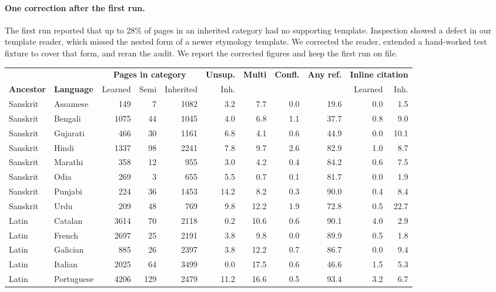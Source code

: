\documentclass[11pt]{article}
\begin{document}
\paragraph{One correction after the first run.} The first run reported that up to 28\% of pages in an inherited category had no supporting template. Inspection showed a defect in our template reader, which missed the nested form of a newer etymology template. We corrected the reader, extended a hand-worked test fixture to cover that form, and reran the audit. We report the corrected figures and keep the first run on file.

\begin{table}[t]
\centering\small
\begin{tabular}{llrrrrrrrrr}
\toprule
& & \multicolumn{3}{c}{\textbf{Pages in category}} & \textbf{Unsup.} & \textbf{Multi} & \textbf{Confl.} & \textbf{Any ref.} & \multicolumn{2}{c}{\textbf{Inline citation}} \\
\textbf{Ancestor} & \textbf{Language} & Learned & Semi & Inherited & Inh. & & & & Learned & Inh. \\
\midrule
Sanskrit & Assamese & 149 & 7 & 1082 & 3.2 & 7.7 & 0.0 & 19.6 & 0.0 & 1.5 \\
Sanskrit & Bengali & 1075 & 44 & 1045 & 4.0 & 6.8 & 1.1 & 37.7 & 0.8 & 9.0 \\
Sanskrit & Gujarati & 466 & 30 & 1161 & 6.8 & 4.1 & 0.6 & 44.9 & 0.0 & 10.1 \\
Sanskrit & Hindi & 1337 & 98 & 2241 & 7.8 & 9.7 & 2.6 & 82.9 & 1.0 & 8.7 \\
Sanskrit & Marathi & 358 & 12 & 955 & 3.0 & 4.2 & 0.4 & 84.2 & 0.6 & 7.5 \\
Sanskrit & Odia & 269 & 3 & 655 & 5.5 & 0.7 & 0.1 & 81.7 & 0.0 & 1.9 \\
Sanskrit & Punjabi & 224 & 36 & 1453 & 14.2 & 8.2 & 0.3 & 90.0 & 0.4 & 8.4 \\
Sanskrit & Urdu & 209 & 48 & 769 & 9.8 & 12.2 & 1.9 & 72.8 & 0.5 & 22.7 \\
\midrule
Latin & Catalan & 3614 & 70 & 2118 & 0.2 & 10.6 & 0.6 & 90.1 & 4.0 & 2.9 \\
Latin & French & 2697 & 25 & 2191 & 3.8 & 9.8 & 0.0 & 89.9 & 0.5 & 1.8 \\
Latin & Galician & 885 & 26 & 2397 & 3.8 & 12.2 & 0.7 & 86.7 & 0.0 & 9.4 \\
Latin & Italian & 2025 & 64 & 3499 & 0.0 & 17.5 & 0.6 & 46.6 & 1.5 & 5.3 \\
Latin & Portuguese & 4206 & 129 & 2479 & 11.2 & 16.6 & 0.5 & 93.4 & 3.2 & 6.7 \\

\end{tabular}
\end{table}
\end{document}
